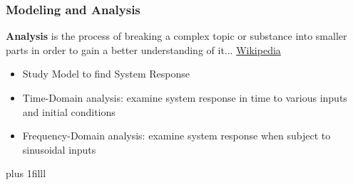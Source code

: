 \documentclass[fleqn]{beamer} %
\newcommand{\sectionIsubsectionIItitle}{Modeling and Analysis}
\newcommand{\btVFill}{\vskip0pt plus 1filll}
\begin{document}
			\begin{frame}
				\frametitle{\sectionIsubsectionIItitle}
				\bigskip

				{\bf Analysis} is the process of breaking a complex topic or substance into smaller parts in order to gain a better understanding of it... \href{https://en.wikipedia.org/wiki/Analysis}{\tiny Wikipedia}

				\begin{itemize}
					\item Study Model to find System Response
					\item Time-Domain analysis: examine system response in time to various inputs and initial conditions
					\item Frequency-Domain analysis: examine system response when subject to sinusoidal inputs
				\end{itemize}
		
				\btVFill
			\end{frame}

\end{document}
